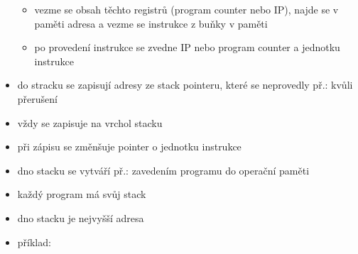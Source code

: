 \documentclass[a4paper,12pt]{article}
\providecommand{\tightlist}{%
\setlength{\itemsep}{0pt}\setlength{\parskip}{0pt}}
\begin{document}
\begin{itemize}
    \begin{itemize}
    \tightlist
    \item vezme se obsah těchto registrů (program counter nebo IP), najde se v
    paměti adresa a vezme se instrukce z buňky v paměti
    \item po provedení instrukce se zvedne IP nebo program counter a jednotku
    instrukce
    \end{itemize}
  \item do stracku se zapisují adresy ze stack pointeru, které se neprovedly
    př.: kvůli přerušení
  \item vždy se zapisuje na vrchol stacku
  \item při zápisu se změnšuje pointer o jednotku instrukce
  \item dno stacku se vytváří př.: zavedením programu do operační paměti
  \item každý program má svůj stack
  \item dno stacku je nejvyšší adresa
  \item příklad:
\end{itemize}
\end{document}
